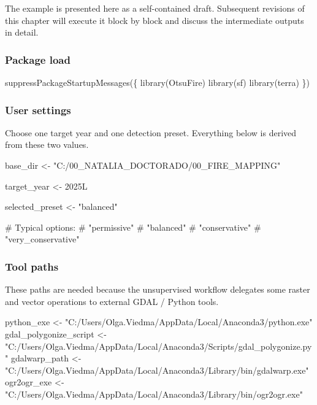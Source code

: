 \documentclass[
  british,
  a4paper,
]{scrbook}
\newenvironment{Shaded}{\begin{snugshade}}{\end{snugshade}}
\newcommand{\CommentTok}[1]{\textcolor[rgb]{0.37,0.37,0.37}{#1}}
\newcommand{\DecValTok}[1]{\textcolor[rgb]{0.68,0.00,0.00}{#1}}
\newcommand{\FunctionTok}[1]{\textcolor[rgb]{0.28,0.35,0.67}{#1}}
\newcommand{\NormalTok}[1]{\textcolor[rgb]{0.00,0.23,0.31}{#1}}
\newcommand{\OtherTok}[1]{\textcolor[rgb]{0.00,0.23,0.31}{#1}}
\newcommand{\StringTok}[1]{\textcolor[rgb]{0.13,0.47,0.30}{#1}}
\begin{document}
The example is presented here as a self-contained draft. Subsequent
revisions of this chapter will execute it block by block and discuss the
intermediate outputs in detail.

\subsubsection{Package load}\label{package-load}

\begin{Shaded}
\begin{Highlighting}[]
\FunctionTok{suppressPackageStartupMessages}\NormalTok{(\{}
  \FunctionTok{library}\NormalTok{(OtsuFire)}
  \FunctionTok{library}\NormalTok{(sf)}
  \FunctionTok{library}\NormalTok{(terra)}
\NormalTok{\})}
\end{Highlighting}
\end{Shaded}

\subsubsection{User settings}\label{user-settings}

Choose one target year and one detection preset. Everything below is
derived from these two values.

\begin{Shaded}
\begin{Highlighting}[]
\NormalTok{base\_dir }\OtherTok{\textless{}{-}} \StringTok{"C:/00\_NATALIA\_DOCTORADO/00\_FIRE\_MAPPING"}

\NormalTok{target\_year }\OtherTok{\textless{}{-}} \DecValTok{2025}\NormalTok{L}

\NormalTok{selected\_preset }\OtherTok{\textless{}{-}} \StringTok{"balanced"}

\CommentTok{\# Typical options:}
\CommentTok{\#   "permissive"}
\CommentTok{\#   "balanced"}
\CommentTok{\#   "conservative"}
\CommentTok{\#   "very\_conservative"}
\end{Highlighting}
\end{Shaded}

\subsubsection{Tool paths}\label{tool-paths}

These paths are needed because the unsupervised workflow delegates some
raster and vector operations to external GDAL / Python tools.

\begin{Shaded}
\begin{Highlighting}[]
\NormalTok{python\_exe }\OtherTok{\textless{}{-}} \StringTok{"C:/Users/Olga.Viedma/AppData/Local/Anaconda3/python.exe"}
\NormalTok{gdal\_polygonize\_script }\OtherTok{\textless{}{-}} \StringTok{"C:/Users/Olga.Viedma/AppData/Local/Anaconda3/Scripts/gdal\_polygonize.py"}
\NormalTok{gdalwarp\_path }\OtherTok{\textless{}{-}} \StringTok{"C:/Users/Olga.Viedma/AppData/Local/Anaconda3/Library/bin/gdalwarp.exe"}
\NormalTok{ogr2ogr\_exe }\OtherTok{\textless{}{-}} \StringTok{"C:/Users/Olga.Viedma/AppData/Local/Anaconda3/Library/bin/ogr2ogr.exe"}
\end{Highlighting}
\end{Shaded}
\end{document}
